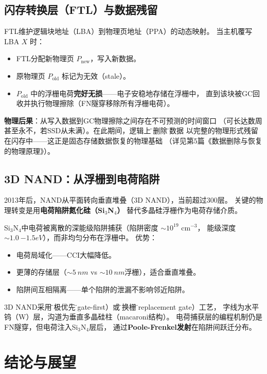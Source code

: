 \documentclass[11pt,a4paper,twoside]{article}
\theoremstyle{definition}
\theoremstyle{plain}
\theoremstyle{remark}
\begin{document}
\subsection{闪存转换层（FTL）与数据残留}

FTL维护逻辑块地址（LBA）到物理页地址（PPA）的动态映射。
当主机覆写LBA $X$ 时：
\begin{itemize}
  \item FTL分配新物理页 $P_{\text{new}}$，写入新数据。
  \item 原物理页 $P_{\text{old}}$ 标记为无效（stale）。
  \item $P_{\text{old}}$ 中的浮栅电荷\textbf{完好无损}——电子安稳地存储在浮栅中，
  直到该块被GC回收并执行物理擦除（FN隧穿移除所有浮栅电荷）。
\end{itemize}

\textbf{物理后果}：从写入数据到GC物理擦除之间存在不可预测的时间窗口
（可长达数周甚至永不，若SSD从未满）。在此期间，逻辑上\"已删除\"的数据
以完整的物理形式残留在闪存中——这正是固态存储数据恢复的物理基础
（详见第5篇《数据删除与恢复的物理原理》）。

\subsection{3D NAND：从浮栅到电荷陷阱}

2013年后，NAND从平面转向垂直堆叠（3D NAND），当前超过300层。
关键的物理转变是用\textbf{电荷陷阱氮化硅（Si$_3$N$_4$）}
替代多晶硅浮栅作为电荷存储介质。

Si$_3$N$_4$中电荷被离散的深能级陷阱捕获（陷阱密度 $\sim 10^{19}$ cm$^{-3}$，
能级深度 $\sim \SI{1.0}{-1.5}{eV}$），而非均匀分布在浮栅中。
优势：
\begin{itemize}
  \item 电荷局域化——CCI大幅降低。
  \item 更薄的存储层（$\sim \SI{5}{nm}$ vs $\sim \SI{10}{nm}$浮栅），适合垂直堆叠。
  \item 陷阱间互相隔离——单个陷阱的泄漏不影响邻近陷阱。
\end{itemize}

3D NAND采用\"栅极优先\"（gate-first）或\"替换栅\"（replacement gate）工艺，
字线为水平钨（W）层，沟道为垂直多晶硅柱（macaroni结构）。
电荷捕获层的编程机制仍是FN隧穿，但电荷注入Si$_3$N$_4$层后，
通过\textbf{Poole-Frenkel发射}在陷阱间跃迁分布。

\section{结论与展望}
\label{sec:conclusion}
\end{document}
